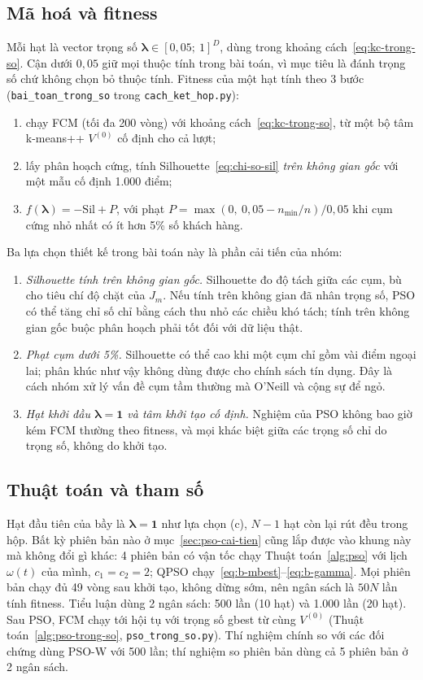 \subsection{Mã hoá và fitness}

Mỗi hạt là vector trọng số $\symbf{\lambda} \in [0{,}05;\ 1]^D$, dùng trong khoảng cách~\eqref{eq:kc-trong-so}. Cận dưới
$0{,}05$ giữ mọi thuộc tính trong bài toán, vì mục tiêu là đánh trọng số chứ không chọn bỏ thuộc tính. Fitness của một hạt tính
theo 3 bước (\texttt{bai\_toan\_trong\_so} trong \texttt{cach\_ket\_hop.py}):
\begin{enumerate}[leftmargin=*]
  \item chạy FCM (tối đa 200 vòng) với khoảng cách~\eqref{eq:kc-trong-so}, từ một bộ tâm k-means++ $V^{(0)}$ cố định cho
  cả lượt;
  \item lấy phân hoạch cứng, tính Silhouette~\eqref{eq:chi-so-sil} \emph{trên không gian gốc} với một mẫu cố định 1.000 điểm;
  \item $f(\symbf{\lambda}) = -\mathrm{Sil} + P$, với phạt $P = \max(0,\ 0{,}05 - n_{\min}/n) / 0{,}05$ khi cụm cứng nhỏ nhất
  có ít hơn 5\% số khách hàng.
\end{enumerate}
Ba lựa chọn thiết kế trong bài toán này là phần cải tiến của nhóm:
\begin{enumerate}[label=(\alph*), leftmargin=*]
\item \emph{Silhouette tính trên không gian gốc.} Silhouette đo độ tách giữa các cụm, bù cho tiêu chí độ chặt của $J_m$. Nếu
tính trên không gian đã nhân trọng số, PSO có thể tăng chỉ số chỉ bằng cách thu nhỏ các chiều khó tách; tính trên không gian
gốc buộc phân hoạch phải tốt đối với dữ liệu thật.
\item \emph{Phạt cụm dưới 5\%.} Silhouette có thể cao khi một cụm chỉ gồm vài điểm ngoại lai; phân khúc như vậy không dùng
được cho chính sách tín dụng. Đây là cách nhóm xử lý vấn đề cụm tầm thường mà O'Neill và cộng sự để ngỏ.
\item \emph{Hạt khởi đầu $\symbf{\lambda} = \mathbf{1}$ và tâm khởi tạo cố định.} Nghiệm của PSO không bao giờ kém FCM thường
theo fitness, và mọi khác biệt giữa các trọng số chỉ do trọng số, không do khởi tạo.
\end{enumerate}

\subsection{Thuật toán và tham số}

Hạt đầu tiên của bầy là $\symbf{\lambda} = \mathbf{1}$ như lựa chọn (c), $N - 1$ hạt còn lại rút đều trong hộp. Bất kỳ phiên bản nào ở mục~\ref{sec:pso-cai-tien} cũng lắp được
vào khung này mà không đổi gì khác: 4 phiên bản có vận tốc chạy Thuật toán~\ref{alg:pso} với lịch $\omega(t)$ của mình,
$c_1 = c_2 = 2$; QPSO chạy~\eqref{eq:b-mbest}--\eqref{eq:b-gamma}. Mọi phiên bản chạy đủ 49 vòng sau khởi tạo, không dừng
sớm, nên ngân sách là $50N$ lần tính fitness. Tiểu luận dùng 2 ngân sách: 500 lần (10 hạt) và 1.000 lần (20 hạt). Sau PSO,
FCM chạy tới hội tụ với trọng số gbest từ cùng $V^{(0)}$ (Thuật toán~\ref{alg:pso-trong-so}, \texttt{pso\_trong\_so.py}).
Thí nghiệm chính so với các đối chứng dùng PSO-W với 500 lần; thí nghiệm so phiên bản dùng cả 5 phiên bản ở 2 ngân sách.

